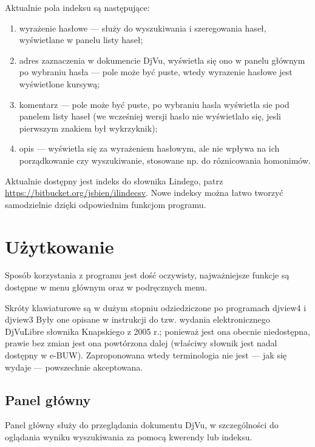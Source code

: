 \documentclass{mwart}
\begin{document}
Aktualnie pola indeksu są następujące:
\begin{enumerate}
\item wyrażenie hasłowe --- służy do wyszukiwania i szeregowania
  haseł, wyświetlane w panelu listy haseł;
\item adres zaznaczenia w dokumencie DjVu, wyświetla się ono w panelu
  głównym po wybraniu hasła --- pole może być puste, wtedy wyrazenie
  hasłowe jest wyświetlone kursywą;
\item komentarz --- pole może być puste, po wybraniu hasla wyświetla
  sie pod panelem listy haseł (we wcześniej wersji hasło nie
  wyświetlało się, jesli pierwszym znakiem był wykrzyknik);
\item opis --- wyświetla się za wyrażeniem hasłowym, ale nie wpływa na
  ich porządkowanie czy wyszukiwanie, stosowane np. do róznicowania
  homonimów.
\end{enumerate}

Aktualnie dostępny jest indeks do słownika Lindego, patrz
\url{https://bitbucket.org/jsbien/ilindecsv}. Nowe indeksy można łatwo
tworzyć samodzielnie dzięki odpowiednim funkcjom programu. 

\section{Użytkowanie}
\label{sec:uytkowanie}

Sposób korzystania z programu jest dość oczywisty, najważniejsze
funkcje są dostępne w menu głównym oraz w podręcznych menu.

Skróty klawiaturowe są w dużym stopniu odziedziczone po programach
\textsf{djview4} i \textsf{djview3} Były one opisane w instrukcji do
tzw. wydania elektronicznego DjVuLibre słownika Knapskiego z 2005 r.;
ponieważ jest ona obecnie niedostępna, prawie bez zmian jest ona
powtórzona dalej (właściwy słownik jest nadal dostępny w e-BUW).
Zaproponowana wtedy terminologia nie jest --- jak się wydaje ---
powszechnie akceptowana.

\subsection{Panel główny}
\label{sec:panel-gowny}

Panel główny służy do przeglądania dokumentu DjVu, w szczególności do
oglądania wyniku wyszukiwania za pomocą kwerendy lub indeksu.
\end{document}
